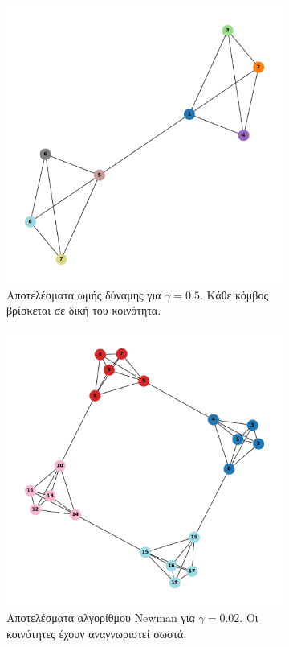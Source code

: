 \documentclass[10pt, letterpaper]{article}
\begin{document}
\begin{figure}[H]
  \begin{subfigure}{0.5\textwidth}
    \centering 
    \includegraphics[width=0.68\linewidth]{quad_comm_gamma=0.5.pdf}
    \caption{Αποτελέσματα ωμής δύναμης για $\gamma = 0.5$. Κάθε κόμβος βρίσκεται σε δική του κοινότητα.}
    \label{fig:graph8comm}
  \end{subfigure}
  \begin{subfigure}{0.5\textwidth}
    \centering 
    \includegraphics[width=0.75\linewidth]{cluster_4,5gamma=0.02,newman.pdf}
    \caption{Αποτελέσματα αλγορίθμου \textlatin{Newman} για $\gamma = 0.02$. Οι κοινότητες έχουν αναγνωριστεί σωστά.}
    \label{fig:newman4,5}
  \end{subfigure}
  \caption{}
  \label{}
\end{figure}
\end{document}
